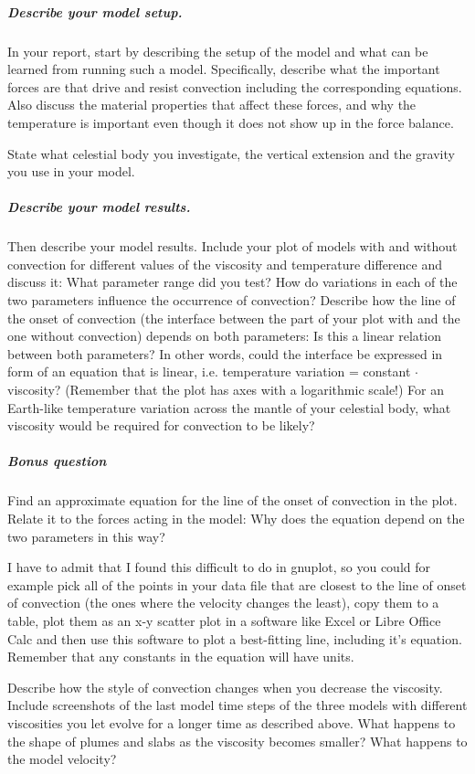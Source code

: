 \subparagraph{Describe your model setup.}
In your report, start by describing the setup of the model and what can be learned from running such a model. 
Specifically, describe what the important forces are that drive and resist convection including the corresponding equations. 
Also discuss the material properties that affect these forces, and why the temperature is important even though it does not show up in the force balance. 

State what celestial body you investigate, the vertical extension and the gravity you use in your model. 

\subparagraph{Describe your model results.}
Then describe your model results. Include your plot of models with and without convection for different values of the viscosity and temperature difference and discuss it:
What parameter range did you test?
How do variations in each of the two parameters influence the occurrence of convection? 
Describe how the line of the onset of convection (the interface between the part of your plot with and the one without convection)
depends on both parameters: Is this a linear relation between both parameters? In other words, could the interface be expressed in form of an equation that is linear, i.e. temperature variation = constant $\cdot$ viscosity? (Remember that the plot has axes with a logarithmic scale!)
For an Earth-like temperature variation across the mantle of your celestial body, what viscosity would be required for convection to be likely?

\subparagraph{Bonus question }
Find an approximate equation for the line of the onset of convection in the plot. 
Relate it to the forces acting in the model: Why does the equation depend on the two parameters in this way?

I have to admit that I found this difficult to do in gnuplot, so you could for example pick all of the points in your data file that are closest to the line of onset of convection (the ones where the velocity changes the least), copy them to a table, plot them as an x-y scatter plot in a software like Excel or Libre Office Calc and then use this software to plot a best-fitting line, including it's equation. 
Remember that any constants in the equation will have units. 

Describe how the style of convection changes when you decrease the viscosity. Include screenshots of the last model time steps of the three models with different viscosities you let evolve for a longer time as described above. What happens to the shape of plumes and slabs as the viscosity becomes smaller? What happens to the model velocity?


